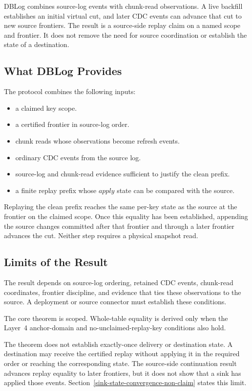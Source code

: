 \documentclass[letterpaper,10pt,twocolumn]{article}
\newcommand{\Apply}{\mathit{apply}}
\providecommand{\tightlist}{\setlength{\itemsep}{0pt}\setlength{\parskip}{0pt}}
\begin{document}
DBLog combines source-log events with chunk-read observations. A live
backfill establishes an initial virtual cut, and later CDC events can
advance that cut to new source frontiers. The result is a source-side
replay claim on a named scope and frontier. It does not remove the need
for source coordination or establish the state of a destination.

\subsection{What DBLog Provides}\label{what-dblog-is}

The protocol combines the following inputs:

\begin{itemize}\tightlist
\item a claimed key scope.
\item a certified frontier in source-log order.
\item chunk reads whose observations become refresh events.
\item ordinary CDC events from the source log.
\item source-log and chunk-read evidence sufficient to justify the
  clean prefix.
\item a finite replay prefix whose $\Apply$ state can be compared with
  the source.
\end{itemize}

Replaying the clean prefix reaches the same per-key state as the source
at the frontier on the claimed scope. Once this equality has been
established, appending the source changes committed after that frontier
and through a later frontier advances the cut. Neither step requires a
physical snapshot read.

\subsection{Limits of the Result}\label{what-dblog-is-not}

The result depends on source-log ordering, retained CDC events,
chunk-read coordinates, frontier discipline, and evidence that ties
these observations to the source. A deployment or source connector must
establish these conditions.

The core theorem is scoped. Whole-table equality is derived only when
the Layer~4 anchor-domain and no-unclaimed-replay-key conditions also
hold.

The theorem does not establish exactly-once delivery or destination
state. A destination may receive the certified replay without applying
it in the required order or reaching the corresponding state. The
source-side continuation result advances replay equality to later
frontiers, but it does not show that a sink has applied those events.
Section~\ref{sink-state-convergence-non-claim} states this limit.
\end{document}
